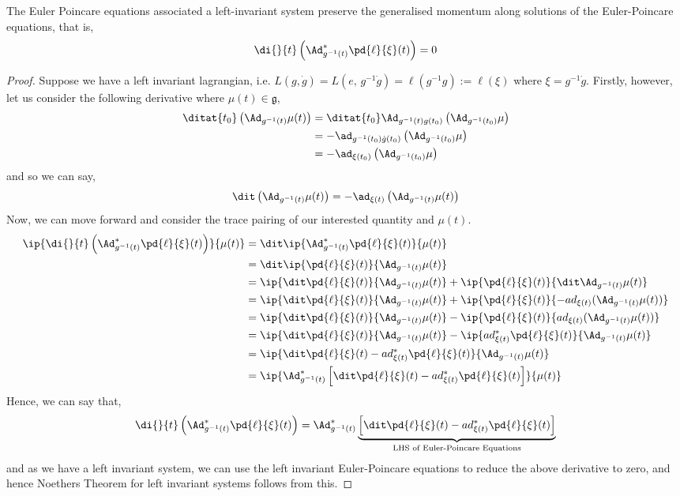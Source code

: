 \begin{nthm}
  The Euler Poincare equations associated a left-invariant system preserve the generalised momentum along solutions of the Euler-Poincare equations, that is,
  $$ \di{}{t} \left(\Ad^*_{g^{-1}(t)}\pd{\ell}{\xi}(t)\right) = 0 $$
\end{nthm}
{\color{red} \begin{proof}
  Suppose we have a left invariant lagrangian, i.e. $L(g, \dot g) = L(e,\,g^{-1}\dot g) = \ell(g^{-1}g) := \ell(\xi)$ where $\xi = g^{-1}\dot g$. Firstly, however, let us consider the following derivative where $\mu(t) \in \mathfrak{g}$,
  \begin{align*}
    \ditat{t_0}\left( \Ad_{g^{-1}(t)}\mu(t) \right) &= \ditat{t_0} \Ad_{g^{-1}(t)g(t_0)}\left( \Ad_{g^{-1}(t_0)} \mu\right)\\
    &= -\ad_{g^{-1}(t_0)\dot g(t_0)} \left( \Ad_{g^{-1}(t_0)} \mu\right)\\
    &= -\ad_{\xi(t_0)} \left( \Ad_{g^{-1}(t_0)} \mu\right)
  \end{align*}
  and so we can say,
  $$ \dit\left( \Ad_{g^{-1}(t)}\mu(t) \right) = -\ad_{\xi(t)} \left( \Ad_{g^{-1}(t)} \mu(t)\right) $$
  Now, we can move forward and consider the trace pairing of our interested quantity and $\mu(t)$.
  \begin{align*}
    \ip{ \di{}{t} \left(\Ad^*_{g^{-1}(t)}\pd{\ell}{\xi}(t)\right) }{ \mu(t) } &= \dit \ip{ \Ad^*_{g^{-1}(t)}\pd{\ell}{\xi}(t) }{ \mu(t) } \\
    &= \dit \ip{ \pd{\ell}{\xi}(t) }{ \Ad_{g^{-1}(t)}\mu(t) } \\
    &=  \ip{ \dit\pd{\ell}{\xi}(t) }{ \Ad_{g^{-1}(t)}\mu(t) } + \ip{ \pd{\ell}{\xi}(t) }{ \dit\Ad_{g^{-1}(t)}\mu(t) } \\
    &=  \ip{ \dit\pd{\ell}{\xi}(t) }{ \Ad_{g^{-1}(t)}\mu(t) } + \ip{ \pd{\ell}{\xi}(t) }{ -ad_{\xi(t)}(\Ad_{g^{-1}(t)}\mu(t)) } \\
    &=  \ip{ \dit\pd{\ell}{\xi}(t) }{ \Ad_{g^{-1}(t)}\mu(t) } - \ip{ \pd{\ell}{\xi}(t) }{ ad_{\xi(t)}(\Ad_{g^{-1}(t)}\mu(t)) } \\
    &=  \ip{ \dit\pd{\ell}{\xi}(t) }{ \Ad_{g^{-1}(t)}\mu(t) } - \ip{ ad^*_{\xi(t)}\pd{\ell}{\xi}(t) }{ \Ad_{g^{-1}(t)}\mu(t) } \\
    &=  \ip{ \dit\pd{\ell}{\xi}(t) - ad^*_{\xi(t)}\pd{\ell}{\xi}(t) }{ \Ad_{g^{-1}(t)}\mu(t) } \\
    &=  \ip{ \Ad^*_{g^{-1}(t)}\left[\dit\pd{\ell}{\xi}(t) - ad^*_{\xi(t)}\pd{\ell}{\xi}(t)\right] }{ \mu(t) } \\
  \end{align*}
  Hence, we can say that,
  $$ \di{}{t} \left(\Ad^*_{g^{-1}(t)}\pd{\ell}{\xi}(t)\right) = \Ad^*_{g^{-1}(t)}\underbrace{\left[\dit\pd{\ell}{\xi}(t) - ad^*_{\xi(t)}\pd{\ell}{\xi}(t)\right]}_{\text{LHS of Euler-Poincare Equations}}  $$
  and as we have a left invariant system, we can use the left invariant Euler-Poincare equations to reduce the above derivative to zero, and hence Noethers Theorem for left invariant systems follows from this.
\end{proof} }

